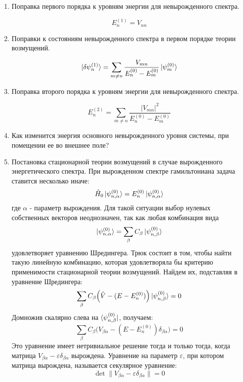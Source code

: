 \documentclass{article}
\begin{document}
\begin{enumerate}
		\item {Поправка первого порядка к уровням энергии для невырожденного спектра.}
		
		\begin{equation}
			E_{n}^{(1)} = V_{nn}
		\end{equation}
		\item {Поправки к состояниям невырожденного спектра в первом порядке теории возмущений.}
		
		\begin{equation}
			\ket{\delta\psi_n^{(1)}} = \sum\limits_{m\neq n} \frac{V_{mn}}{E_n^{(0)} - E_m^{(0)}} \ket{\psi_m^{(0)}}
		\end{equation}
		
		\item {Поправка второго порядка к уровням энергии для невырожденного спектра.}
		
		\begin{equation}
			E_n^{(2)} = \sum\limits_{m\neq n} \frac{|V_{mn}|^2}{E_n^{(0)} - E_m^{(0)}}
		\end{equation}	
		
		\item {Как изменится энергия основного невырожденного уровня системы, при помещении ее во внешнее поле?}	
		
		\item {Постановка стационарной теории возмущений в случае вырожденного энергетического спектра.}
		При вырожденном спектре гамильтониана задача ставится несколько иначе:
		\begin{equation}
			\hat{H}_0 \ket{\psi^{(0)}_{n,\alpha}} = E_n^{(0)}\ket{\psi^{(0)}_{n,\alpha}}
		\end{equation}
		где $\alpha$ - параметр вырождения. Для такой ситуации выбор нулевых собственных векторов неоднозначен, так как любая комбинация вида
		\begin{equation}
			\ket{\psi^{(0)}_{n,\alpha}} = \sum\limits_{\beta} C_\beta \ket{\psi^{(0)}_{n,\beta}} 
		\end{equation}
		удовлетворяет уравнению Шредингера. Трюк состоит в том, чтобы найти такую линейную комбинацию, которая удовлетворяла бы критерию применимости стационарной теории возмущений. Найдем их, подставляя в уравнение Шредингера:
		\begin{equation}
			\sum\limits_{\beta} C_\beta \Big( \hat{V} - (E - E_n^{(0)}) \Big) \ket{\psi_{n,\beta}^{(0)}} = 0
		\end{equation}
		Домножив скалярно слева на $\bra{\psi_{n,\beta}^{(0)}}$, получаем:
		\begin{equation}
			\sum\limits_{\beta} C_\beta \Big( V_{\beta\alpha} - (E - E_n^{(0)})\delta_{\beta\alpha} \Big) = 0
		\end{equation}
		Это уравнение имеет нетривиальное решение тогда и только тогда, когда матрица $V_{\beta\alpha} - \varepsilon \delta_{\beta\alpha}$ вырождена. Уравнение на параметр $\varepsilon$, при котором матрица вырождена, называется {секулярное уравнение}:
		\begin{equation}
			\det \|V_{\beta\alpha} - \varepsilon \delta_{\beta\alpha}\| = 0
		\end{equation}
		

\end{enumerate}
\end{document}
